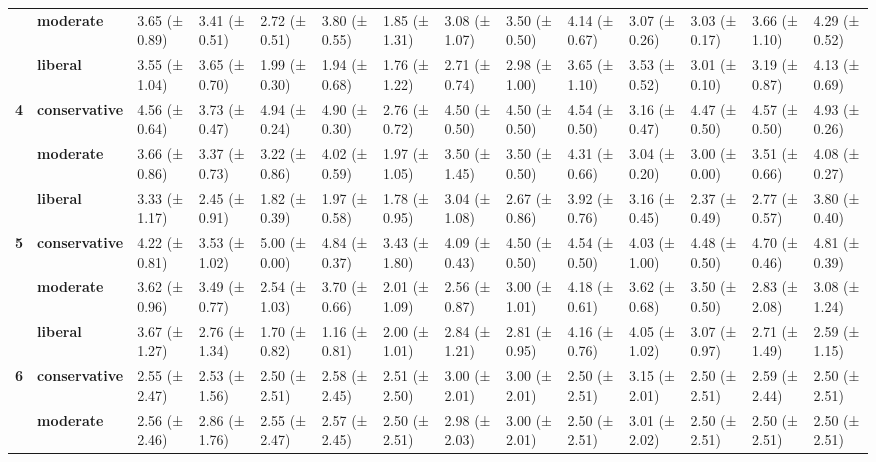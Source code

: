 \begin{longtable}{llllllllllllll}
\textbf{} & \textbf{moderate} & 3.65 (± 0.89) & 3.41 (± 0.51) & 2.72 (± 0.51) & 3.80 (± 0.55) & 1.85 (± 1.31) & 3.08 (± 1.07) & 3.50 (± 0.50) & 4.14 (± 0.67) & 3.07 (± 0.26) & 3.03 (± 0.17) & 3.66 (± 1.10) & 4.29 (± 0.52) \\
\textbf{} & \textbf{liberal} & 3.55 (± 1.04) & 3.65 (± 0.70) & 1.99 (± 0.30) & 1.94 (± 0.68) & 1.76 (± 1.22) & 2.71 (± 0.74) & 2.98 (± 1.00) & 3.65 (± 1.10) & 3.53 (± 0.52) & 3.01 (± 0.10) & 3.19 (± 0.87) & 4.13 (± 0.69) \\
\cline{1-14}
\multirow[t]{3}{*}{\textbf{4}} & \textbf{conservative} & 4.56 (± 0.64) & 3.73 (± 0.47) & 4.94 (± 0.24) & 4.90 (± 0.30) & 2.76 (± 0.72) & 4.50 (± 0.50) & 4.50 (± 0.50) & 4.54 (± 0.50) & 3.16 (± 0.47) & 4.47 (± 0.50) & 4.57 (± 0.50) & 4.93 (± 0.26) \\
\textbf{} & \textbf{moderate} & 3.66 (± 0.86) & 3.37 (± 0.73) & 3.22 (± 0.86) & 4.02 (± 0.59) & 1.97 (± 1.05) & 3.50 (± 1.45) & 3.50 (± 0.50) & 4.31 (± 0.66) & 3.04 (± 0.20) & 3.00 (± 0.00) & 3.51 (± 0.66) & 4.08 (± 0.27) \\
\textbf{} & \textbf{liberal} & 3.33 (± 1.17) & 2.45 (± 0.91) & 1.82 (± 0.39) & 1.97 (± 0.58) & 1.78 (± 0.95) & 3.04 (± 1.08) & 2.67 (± 0.86) & 3.92 (± 0.76) & 3.16 (± 0.45) & 2.37 (± 0.49) & 2.77 (± 0.57) & 3.80 (± 0.40) \\
\cline{1-14}
\multirow[t]{3}{*}{\textbf{5}} & \textbf{conservative} & 4.22 (± 0.81) & 3.53 (± 1.02) & 5.00 (± 0.00) & 4.84 (± 0.37) & 3.43 (± 1.80) & 4.09 (± 0.43) & 4.50 (± 0.50) & 4.54 (± 0.50) & 4.03 (± 1.00) & 4.48 (± 0.50) & 4.70 (± 0.46) & 4.81 (± 0.39) \\
\textbf{} & \textbf{moderate} & 3.62 (± 0.96) & 3.49 (± 0.77) & 2.54 (± 1.03) & 3.70 (± 0.66) & 2.01 (± 1.09) & 2.56 (± 0.87) & 3.00 (± 1.01) & 4.18 (± 0.61) & 3.62 (± 0.68) & 3.50 (± 0.50) & 2.83 (± 2.08) & 3.08 (± 1.24) \\
\textbf{} & \textbf{liberal} & 3.67 (± 1.27) & 2.76 (± 1.34) & 1.70 (± 0.82) & 1.16 (± 0.81) & 2.00 (± 1.01) & 2.84 (± 1.21) & 2.81 (± 0.95) & 4.16 (± 0.76) & 4.05 (± 1.02) & 3.07 (± 0.97) & 2.71 (± 1.49) & 2.59 (± 1.15) \\
\cline{1-14}
\multirow[t]{3}{*}{\textbf{6}} & \textbf{conservative} & 2.55 (± 2.47) & 2.53 (± 1.56) & 2.50 (± 2.51) & 2.58 (± 2.45) & 2.51 (± 2.50) & 3.00 (± 2.01) & 3.00 (± 2.01) & 2.50 (± 2.51) & 3.15 (± 2.01) & 2.50 (± 2.51) & 2.59 (± 2.44) & 2.50 (± 2.51) \\
\textbf{} & \textbf{moderate} & 2.56 (± 2.46) & 2.86 (± 1.76) & 2.55 (± 2.47) & 2.57 (± 2.45) & 2.50 (± 2.51) & 2.98 (± 2.03) & 3.00 (± 2.01) & 2.50 (± 2.51) & 3.01 (± 2.02) & 2.50 (± 2.51) & 2.50 (± 2.51) & 2.50 (± 2.51) \\

\end{longtable}
